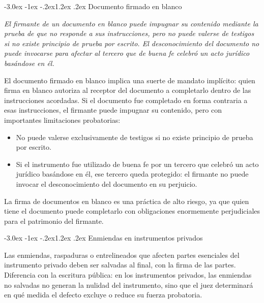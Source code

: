 \documentclass[12pt,oneside]{book}
\makeatletter
\renewcommand\section{\@startsection{section}{1}{\z@}%
  {-3.0ex \@plus -1ex \@minus -.2ex}{1.2ex \@plus .2ex}%
  {\normalfont\large\bfseries\color{acento}}}
\makeatother
\begin{document}
\section{Documento firmado en blanco}

\begin{regla}
\textit{El firmante de un documento en blanco puede impugnar su contenido mediante la prueba de que no responde a sus instrucciones, pero no puede valerse de testigos si no existe principio de prueba por escrito. El desconocimiento del documento no puede invocarse para afectar al tercero que de buena fe celebró un acto jurídico basándose en él.}
\end{regla}

El documento firmado en blanco implica una suerte de mandato implícito: quien firma en blanco autoriza al receptor del documento a completarlo dentro de las instrucciones acordadas. Si el documento fue completado en forma contraria a esas instrucciones, el firmante puede impugnar su contenido, pero con importantes limitaciones probatorias:

\begin{itemize}
    \item No puede valerse exclusivamente de testigos si no existe principio de prueba por escrito.
    \item Si el instrumento fue utilizado de buena fe por un tercero que celebró un acto jurídico basándose en él, ese tercero queda protegido: el firmante no puede invocar el desconocimiento del documento en su perjuicio.
\end{itemize}

\begin{importante}
La firma de documentos en blanco es una práctica de alto riesgo, ya que quien tiene el documento puede completarlo con obligaciones enormemente perjudiciales para el patrimonio del firmante.
\end{importante}

\section{Enmiendas en instrumentos privados}

Las enmiendas, raspaduras o entrelineados que afecten partes esenciales del instrumento privado deben ser salvadas al final, con la firma de las partes. Diferencia con la escritura pública: en los instrumentos privados, las enmiendas no salvadas no generan la nulidad del instrumento, sino que el juez determinará en qué medida el defecto excluye o reduce su fuerza probatoria.
\end{document}
